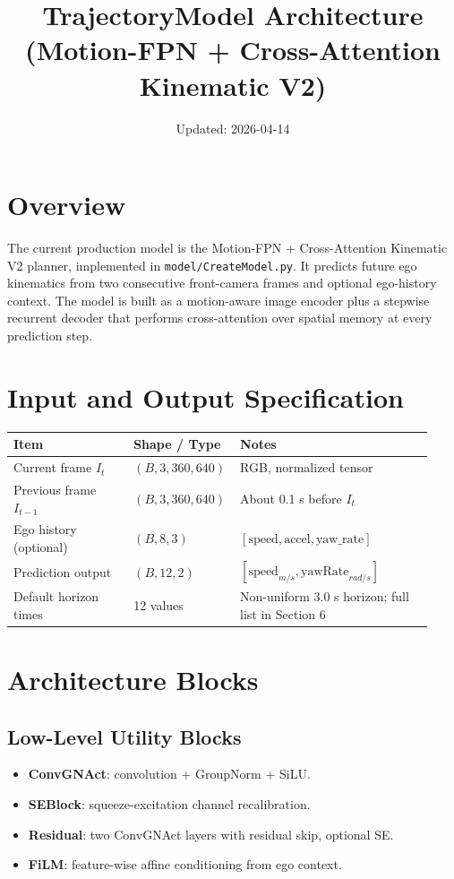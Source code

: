 \documentclass[a4paper,12pt]{article}
\begin{document}
\title{TrajectoryModel Architecture (Motion-FPN + Cross-Attention Kinematic V2)}
\author{}
\date{Updated: 2026-04-14}
\maketitle

\section{Overview}
The current production model is the Motion-FPN + Cross-Attention Kinematic V2 planner, implemented in \texttt{model/CreateModel.py}.
It predicts future ego kinematics from two consecutive front-camera frames and optional ego-history context.
The model is built as a motion-aware image encoder plus a stepwise recurrent decoder that performs cross-attention over spatial memory at every prediction step.

\section{Input and Output Specification}

\begin{center}
\begin{tabular}{@{}p{0.28\linewidth}p{0.20\linewidth}p{0.45\linewidth}@{}}
\toprule
Item & Shape / Type & Notes \\
\midrule
Current frame $I_t$ & $(B,3,360,640)$ & RGB, normalized tensor \\
Previous frame $I_{t-1}$ & $(B,3,360,640)$ & About 0.1 s before $I_t$ \\
Ego history (optional) & $(B,8,3)$ & $[\text{speed},\text{accel},\text{yaw\_rate}]$ \\
Prediction output & $(B,12,2)$ & $[\text{speed}_{m/s},\text{yawRate}_{rad/s}]$ \\
Default horizon times & 12 values & Non-uniform 3.0 s horizon; full list in Section 6 \\
\bottomrule
\end{tabular}
\end{center}

\section{Architecture Blocks}

\subsection{Low-Level Utility Blocks}
\begin{itemize}
    \item \textbf{ConvGNAct}: convolution + GroupNorm + SiLU.
    \item \textbf{SEBlock}: squeeze-excitation channel recalibration.
    \item \textbf{Residual}: two ConvGNAct layers with residual skip, optional SE.
    \item \textbf{FiLM}: feature-wise affine conditioning from ego context.
\end{itemize}
\end{document}
